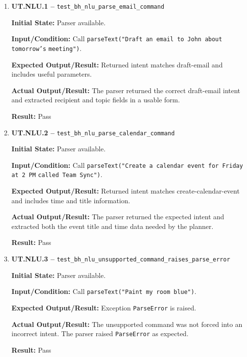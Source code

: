 \documentclass[12pt]{article}
\begin{document}
\begin{enumerate}
    \item \textbf{UT.NLU.1 --}
    \texttt{test\_bh\_nlu\_parse\_email\_command}
    
    \textbf{Initial State:} Parser available.
    
    \textbf{Input/Condition:} Call
    \texttt{parseText("Draft an email to John about tomorrow's}
    \texttt{meeting")}.
    
    \textbf{Expected Output/Result:} Returned intent matches
    draft-email and includes useful parameters.
    
    \textbf{Actual Output/Result:} The parser returned the correct
    draft-email intent and extracted recipient and topic fields in a
    usable form.
    
    \textbf{Result:} Pass
    
    \item \textbf{UT.NLU.2 --}
    \texttt{test\_bh\_nlu\_parse\_calendar\_command}
    
    \textbf{Initial State:} Parser available.
    
    \textbf{Input/Condition:} Call
    \texttt{parseText("Create a calendar event for Friday at 2 PM}
    \texttt{called Team Sync")}.
    
    \textbf{Expected Output/Result:} Returned intent matches
    create-calendar-event and includes time and title information.
    
    \textbf{Actual Output/Result:} The parser returned the expected
    intent and extracted both the event title and time data needed by
    the planner.
    
    \textbf{Result:} Pass
    
    \item \textbf{UT.NLU.3 --}
    \texttt{test\_bh\_nlu\_unsupported\_command\_raises\_parse\_error}
    
    \textbf{Initial State:} Parser available.
    
    \textbf{Input/Condition:} Call
    \texttt{parseText("Paint my room blue")}.
    
    \textbf{Expected Output/Result:} Exception
    \texttt{ParseError} is raised.
    
    \textbf{Actual Output/Result:} The unsupported command was not
    forced into an incorrect intent. The parser raised
    \texttt{ParseError} as expected.
    
    \textbf{Result:} Pass
\end{enumerate}
\end{document}
